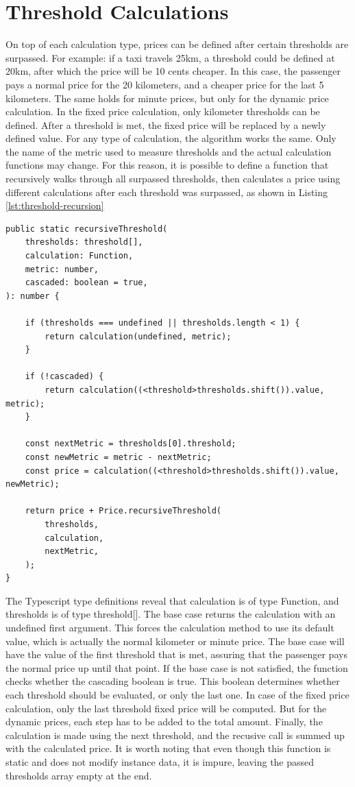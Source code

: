 \section{Threshold Calculations}
On top of each calculation type, prices can be defined after certain thresholds are surpassed. For example: if a taxi travels 25km, a threshold could be defined at 20km, after which the price will be 10 cents cheaper. In this case, the passenger pays a normal price for the 20 kilometers, and a cheaper price for the last 5 kilometers. The same holds for minute prices, but only for the dynamic price calculation. In the fixed price calculation, only kilometer thresholds can be defined. After a threshold is met, the fixed price will be replaced by a newly defined value. For any type of calculation, the algorithm works the same. Only the name of the metric used to measure thresholds and the actual calculation functions may change. For this reason, it is possible to define a function that recursively walks through all surpassed thresholds, then calculates a price using different calculations after each threshold was surpassed, as shown in Listing \ref{lst:threshold-recursion}

\begin{lstlisting}[caption={Recursive threshold calculation.}, label={lst:threshold-recursion}]
public static recursiveThreshold(
	thresholds: threshold[],
	calculation: Function,
	metric: number,
	cascaded: boolean = true,
): number {

	if (thresholds === undefined || thresholds.length < 1) {
		return calculation(undefined, metric);
	}

	if (!cascaded) {
		return calculation((<threshold>thresholds.shift()).value, metric);
	}

	const nextMetric = thresholds[0].threshold;
	const newMetric = metric - nextMetric;
	const price = calculation((<threshold>thresholds.shift()).value, newMetric);

	return price + Price.recursiveThreshold(
		thresholds,
		calculation,
		nextMetric,
	);
}
\end{lstlisting}

The Typescript type definitions reveal that calculation is of type Function, and thresholds is of type threshold[]. The base case returns the calculation with an undefined first argument. This forces the calculation method to use its default value, which is actually the normal kilometer or minute price. The base case will have the value of the first threshold that is met, assuring that the passenger pays the normal price up until that point. If the base case is not satisfied, the function checks whether the cascading boolean is true. This boolean determines whether each threshold should be evaluated, or only the last one. In case of the fixed price calculation, only the last threshold fixed price will be computed. But for the dynamic prices, each step has to be added to the total amount. Finally, the calculation is made using the next threshold,  and the recusive call is summed up with the calculated price. It is worth noting that even though this function is static and does not modify instance data, it is impure, leaving the passed thresholds array empty at the end.

